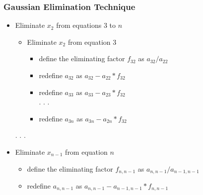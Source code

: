 \documentclass[fleqn]{beamer} %
\newcommand{\sectionIVsubsectionIItitle}{Gaussian Elimination Technique}
\begin{document}
			\begin{frame}
				\frametitle{\sectionIVsubsectionIItitle}
				\bigskip

				\begin{itemize}				
				\item   Eliminate $x_2$ from equations $3$ to $n$ \\
				\begin{itemize}
						\item Eliminate $x_2$ from equation $3$
					\begin{itemize}
						\item define the eliminating factor $f_{32}$ as $a_{32}/a_{22}$
						\item redefine $a_{32}$ as $a_{32}-a_{22}*f_{32}$
						\item redefine $a_{33}$ as $a_{33}-a_{23}*f_{32}$\\
						. . .
						\item redefine $a_{3n}$ as $a_{3n}-a_{2n}*f_{32}$ \\
						
					\end{itemize}
				
				\end{itemize}	
				. . . 
				\item   Eliminate $x_{n-1}$ from equation $n$ 

					\begin{itemize}
						\item define the eliminating factor $f_{n,n-1}$ as $a_{n,n-1}/a_{n-1,n-1}$
						\item redefine $a_{n,n-1}$ as $a_{n,n-1}-a_{n-1,n-1}*f_{n,n-1}$
						
					\end{itemize}
		
				\end{itemize}    

				\btVFill
			\end{frame}	
\end{document}
